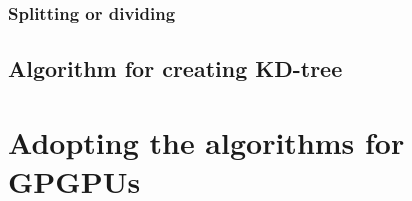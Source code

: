 

\subsubsection{Splitting or dividing}









\subsection{Algorithm for creating KD-tree}




\section{Adopting the algorithms for GPGPUs}






